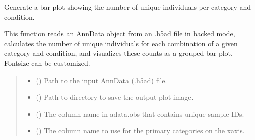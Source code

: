 \documentclass[letterpaper,10pt,english]{sphinxmanual}
\begin{document}
\begin{fulllineitems}
\label{\detokenize{ember_py:ember_py.plots.plot_sample_counts}}
\pysigstartsignatures
\pysiglinewithargsret
{}
{\sphinxparamcomma {}\sphinxparamcomma {}\sphinxparamcomma {}\sphinxparamcomma {}\sphinxparamcomma {}}
{}
\pysigstopsignatures
\sphinxAtStartPar
Generate a bar plot showing the number of unique individuals
per category and condition.

\sphinxAtStartPar
This function reads an AnnData object from an .h5ad file in backed mode,
calculates the number of unique individuals for each combination of a given
category and condition, and visualizes these counts as a grouped bar plot.
Fontsize can be customized.
\begin{quote}\begin{description}
\begin{itemize}
\item {} 
\sphinxAtStartPar
{} (\sphinxstyleliteralemphasis{\sphinxupquote{, }}) \textendash{} Path to the input AnnData (.h5ad) file.

\item {} 
\sphinxAtStartPar
{} (\sphinxstyleliteralemphasis{\sphinxupquote{, }}) \textendash{} Path to directory to save the output plot image.

\item {} 
\sphinxAtStartPar
{} (\sphinxstyleliteralemphasis{\sphinxupquote{, }}) \textendash{} The column name in adata.obs that contains unique sample IDs.

\item {} 
\sphinxAtStartPar
{} (\sphinxstyleliteralemphasis{\sphinxupquote{, }}) \textendash{} The column name to use for the primary categories on the x\sphinxhyphen{}axis.


\end{itemize}
\end{description}
\end{quote}
\end{fulllineitems}
\end{document}
